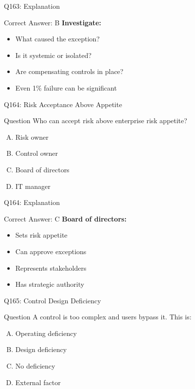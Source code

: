 \documentclass{beamer}
\begin{document}
	\begin{frame}{Q163: Explanation}
		\begin{block}{Correct Answer: B}
			\textbf{Investigate:}
			\begin{itemize}
				\item What caused the exception?
				\item Is it systemic or isolated?
				\item Are compensating controls in place?
				\item Even 1\% failure can be significant
			\end{itemize}
		\end{block}
	\end{frame}
	
	\begin{frame}{Q164: Risk Acceptance Above Appetite}
		\begin{block}{Question}
			Who can accept risk above enterprise risk appetite?
		\end{block}
		\begin{enumerate}[(A)]
			\item Risk owner
			\item Control owner
			\item Board of directors
			\item IT manager
		\end{enumerate}
	\end{frame}
	
	\begin{frame}{Q164: Explanation}
		\begin{block}{Correct Answer: C}
			\textbf{Board of directors:}
			\begin{itemize}
				\item Sets risk appetite
				\item Can approve exceptions
				\item Represents stakeholders
				\item Has strategic authority
			\end{itemize}
		\end{block}
	\end{frame}
	
	\begin{frame}{Q165: Control Design Deficiency}
		\begin{block}{Question}
			A control is too complex and users bypass it. This is:
		\end{block}
		\begin{enumerate}[(A)]
			\item Operating deficiency
			\item Design deficiency
			\item No deficiency
			\item External factor
		\end{enumerate}
	\end{frame}
	
\end{document}
